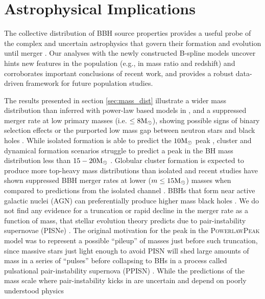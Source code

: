 \section{Astrophysical Implications}\label{sec:astrodiscussion}

The collective distribution of BBH source properties provides a useful probe of the complex and uncertain astrophysics that govern their 
formation and evolution until merger \citep{Rodriguez_2016,Farr2017Nature,Zevin_2017}. Our analyses with the newly constructed B-spline models uncover hints new features in the population (e.g., in mass ratio and redshift) and corroborates important 
conclusions of recent work, and provides a robust data-driven framework for future population studies. 


The results presented in section \ref{sec:mass_dist} illustrate a wider mass distribution than inferred with power-law based models in \citet{o3b_astro_dist}, and a suppressed merger rate 
at low primary masses (i.e. $\leq8{\rm M}_\odot$), showing possible signs of binary selection effects or the purported low mass gap between neutron stars and black holes \citep{Fishbach_2020_mm,Farah_2022,NoPeaksWithoutValleys}. While isolated formation is able to predict the $10{\rm M}_\odot$ peak \citep{Antonini_2020}, cluster and dynamical formation scenarios struggle to predict 
a peak in the BH mass distribution less than $15-20{\rm M}_\odot$ \citep{Hong_2018, Rodriguez_2019}. Globular cluster formation is expected to produce more top-heavy mass distributions than isolated 
and recent studies have shown suppressed BBH merger rates at lower ($m\leq15{\rm M}_\odot$) masses when compared to predictions from the isolated channel \citep{Rodriguez_2015, Rodriguez_2019, BaveraMassTransfer,Belczynski_2016}. 
BBHs that form near active galactic nuclei (AGN) can preferentially produce higher mass black holes \citep{FordAGN, Tagawa_2021, Yang_2019}. 
We do not find any evidence for a truncation or rapid decline in the merger rate as a function of mass, that stellar evolution theory predicts due to pair-instability supernovae (PISNe) \citep{Heger_2002,PISN_Woosley,Heger_2003,Spera_2017}. The original motivation for the peak in the \textsc{PowerlawPeak} model \citep{Talbot_2018} was to represent a possible ``pileup'' of 
masses just before such truncation, since massive stars just light enough to avoid PISN will shed large amounts of mass in a series of ``pulses'' before collapsing to BHs in a process called 
pulsational pair-instability supernova (PPISN) \citep{Woosley_2017,Woosley_2019,Farmer_2019}. While the predictions of the mass scale where pair-instability kicks in are uncertain and depend on poorly understood physics 
